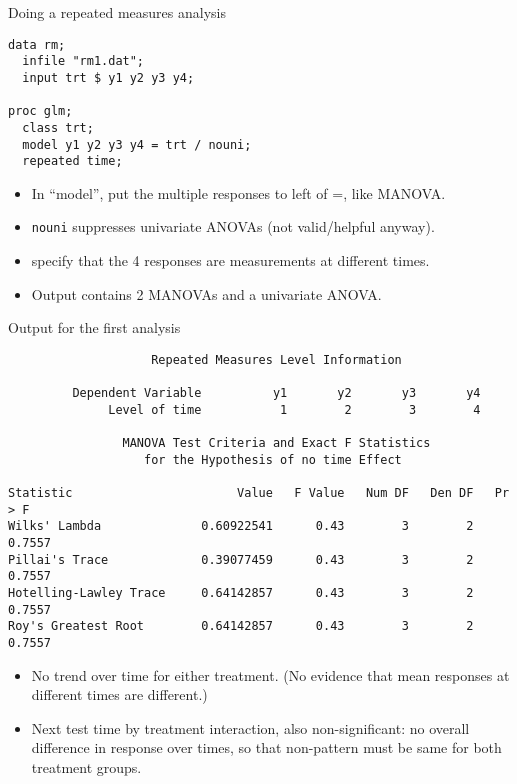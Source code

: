 \documentclass[pdf]{prosper}
\begin{document}
  \begin{slide}{Doing a repeated measures analysis}

\begin{verbatim}
data rm;
  infile "rm1.dat";
  input trt $ y1 y2 y3 y4;

proc glm;
  class trt;
  model y1 y2 y3 y4 = trt / nouni;
  repeated time;

\end{verbatim}

    \begin{itemize}
    \item In ``model'', put the multiple responses to left of =, like MANOVA.
    \item \verb-nouni- suppresses univariate ANOVAs (not valid/helpful anyway).
    \item specify that the 4 responses are measurements at different times.
    \item Output contains 2 MANOVAs and a univariate ANOVA.
    \end{itemize}
    
  \end{slide}

  \begin{slide}{Output for the first analysis}
    {\scriptsize
\begin{verbatim}
                    Repeated Measures Level Information
 
         Dependent Variable          y1       y2       y3       y4
              Level of time           1        2        3        4

                MANOVA Test Criteria and Exact F Statistics
                   for the Hypothesis of no time Effect
 
Statistic                       Value   F Value   Num DF   Den DF   Pr > F
Wilks' Lambda              0.60922541      0.43        3        2   0.7557
Pillai's Trace             0.39077459      0.43        3        2   0.7557
Hotelling-Lawley Trace     0.64142857      0.43        3        2   0.7557
Roy's Greatest Root        0.64142857      0.43        3        2   0.7557
\end{verbatim}
}

\begin{itemize}
\item No trend over time for either treatment. (No evidence that mean responses at different times are different.)
\item Next test time by treatment interaction, also
  non-significant: no overall difference in response over times, so
  that non-pattern must be same for both treatment groups.
\end{itemize}
    
  \end{slide}
\end{document}
